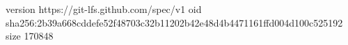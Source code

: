 version https://git-lfs.github.com/spec/v1
oid sha256:2b39a668cddefe52f48703c32b11202b42e48d4b4471161ffd004d100c525192
size 170848

